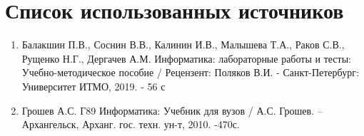 	\section{Список использованных источников}
	\begin{enumerate}
		\item 	Балакшин П.В., Соснин В.В., Калинин И.В., Малышева Т.А., Раков С.В., Рущенко Н.Г., Дергачев А.М. Информатика: лабораторные работы и тесты: Учебно-методическое пособие / Рецензент: Поляков В.И. - Санкт-Петербург: Университет ИТМО, 2019. - 56 с
		
		\item Грошев А.С. Г89 Информатика: Учебник для вузов / А.С. Грошев. – Архангельск, Арханг. гос. техн. ун-т, 2010. -470с.
	\end{enumerate}
	
